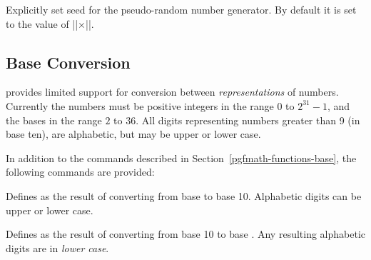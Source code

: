 \begin{command}{\pgfmathsetseed{}}
  Explicitly set seed for the pseudo-random number generator. By
  default it is set to the value of |\time|$\times$|\year|.
\end{command}


      
\subsection{Base Conversion}
	
\label{pgfmath-bases}

\pgfname{} provides limited support for conversion between 
\emph{representations} of numbers. Currently the numbers must be
positive integers in the range $0$ to $2^{31}-1$, and the bases in the
range $2$ to $36$. All digits representing numbers greater than 9 (in
base ten), are alphabetic, but may be upper or lower case. 

In addition to the commands described in 
Section~\ref{pgfmath-functions-base}, 
the following commands are provided:

\begin{command}{\pgfmathbasetodec{}}
	Defines  as the result of converting  from
	base  to base 10. Alphabetic digits can be upper or lower
	case.

\medskip

\end{command}

\begin{command}{\pgfmathdectobase{}}
	Defines  as the result of converting  from
	base 10 to base . Any resulting alphabetic digits are in
	\emph{lower case}.
	
\begin{codeexample}[]
\pgfmathdectobase{} \mynumber
\end{codeexample}

\end{command}

